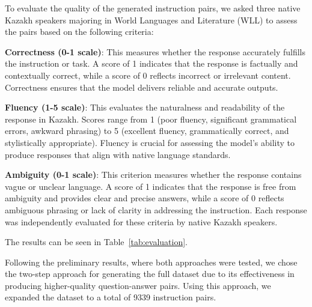 To evaluate the quality of the generated instruction pairs, we asked three native Kazakh speakers majoring in World Languages and Literature (WLL) to assess the pairs based on the following criteria:

\textbf{Correctness (0-1 scale)}:
This measures whether the response accurately fulfills the instruction or task. A score of 1 indicates that the response is factually and contextually correct, while a score of 0 reflects incorrect or irrelevant content. Correctness ensures that the model delivers reliable and 
accurate outputs.


\textbf{Fluency (1-5 scale)}:
This evaluates the naturalness and readability of the response in Kazakh. Scores range from 1 (poor fluency, significant grammatical errors, awkward phrasing) to 5 (excellent fluency, grammatically correct, and stylistically appropriate). Fluency is crucial for assessing the model’s ability to produce responses that align with native language standards.


\textbf{Ambiguity (0-1 scale)}:
This criterion measures whether the response contains vague or unclear language. A score of 1 indicates that the response is free from ambiguity and provides clear and precise answers, while a score of 0 reflects ambiguous phrasing or lack of clarity in addressing the instruction.
Each response was independently evaluated for these criteria by native Kazakh speakers. 
\par The results can be seen in Table~\ref{tab:evaluation}.




Following the preliminary results, where both approaches were tested, we chose the two-step approach for generating the full dataset due to its effectiveness in producing higher-quality question-answer pairs. Using this approach, we expanded the dataset to a total of 9339 instruction pairs.


\begin{table}[ht]
\centering
\renewcommand{\arraystretch}{1.3} %
\caption{Evaluation on sampled data for Instruction Pair Generation}
\label{tab:evaluation}
\end{table}


